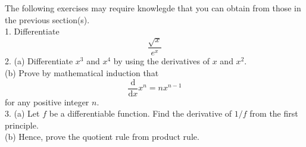 The following exercises may require knowlegde that you can obtain from those in the previous section(s).\\
1. Differentiate
$$\frac{\sqrt x}{e^x}$$
2. (a) Differentiate $x^3$ and $x^4$ by using the derivatives of $x$ and $x^2$.\\
(b) Prove by mathematical induction that
$$\frac{\mathrm d}{\mathrm dx}x^n=nx^{n-1}$$
for any positive integer $n$.\\
3. (a) Let $f$ be a differentiable function. Find the derivative of $1/f$ from the first principle.\\
(b) Hence, prove the quotient rule from product rule.
